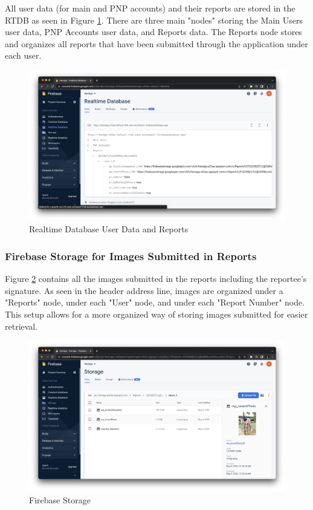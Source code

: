 All user data (for main and PNP accounts) and their reports are stored in the RTDB as seen in Figure \ref{fig:firebaseRTDB}. There are three main "nodes" storing the Main Users user data, PNP Accounts user data, and Reports data. The Reports node stores and organizes all reports that have been submitted through the application under each user.
\begin{figure}[!h]
    \centering
    \begin{minipage}[c]{1\linewidth}
        \centering
        \includegraphics[scale=0.25]{figures/Chapter4/Firebase/rtdbReports.png}
        \caption{Realtime Database User Data and Reports}
        \label{fig:firebaseRTDB}
    \end{minipage}
\end{figure}
\subsubsection{Firebase Storage for Images Submitted in Reports}

Figure \ref{fig:firebaseStorage} contains all the images submitted in the reports including the reportee's signature. As seen in the header address line, images are organized under a "Reports" node, under each "User" node, and under each "Report Number" node. This setup allows for a more organized way of storing images submitted for easier retrieval.
\begin{figure}[!h]
    \centering
    \begin{minipage}[c]{1\linewidth}
        \centering
        \includegraphics[scale=0.25]{figures/Chapter4/Firebase/storage.png}
        \caption{Firebase Storage}
        \label{fig:firebaseStorage}
    \end{minipage}
\end{figure}